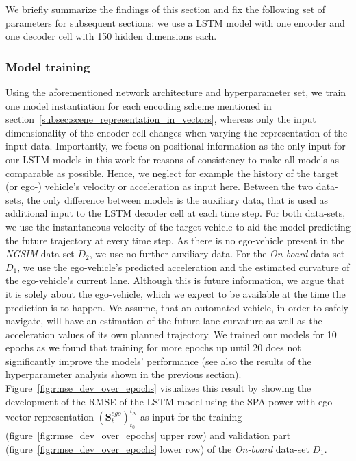 We briefly summarize the findings of this section and fix the following set of parameters for subsequent sections: we use a \ac{LSTM} model with one encoder and one decoder cell with \num{150} hidden dimensions each.

\subsubsection{Model training}%
\label{ssubsec:model_training_lstms}

Using the aforementioned network architecture and hyperparameter set, we train one model instantiation for each encoding scheme mentioned in section~\ref{subsec:scene_representation_in_vectors}, whereas only the input dimensionality of the encoder cell changes when varying the representation of the input data.
Importantly, we focus on positional information as the only input for our \ac{LSTM} models in this work for reasons of consistency to make all models as comparable as possible.
Hence, we neglect for example the history of the target (or ego-) vehicle's velocity or acceleration as input here.
Between the two data-sets, the only difference between models is the auxiliary data, that is used as additional input to the \ac{LSTM} decoder cell at each time step.
For both data-sets, we use the instantaneous velocity of the target vehicle to aid the model predicting the future trajectory at every time step.
As there is no ego-vehicle present in the \emph{\ac{NGSIM}} data-set $D_2$, we use no further auxiliary data.
For the \emph{On-board} data-set $D_1$, we use the ego-vehicle's predicted acceleration and the estimated curvature of the ego-vehicle's current lane.
Although this is future information, we argue that it is solely about the ego-vehicle, which we expect to be available at the time the prediction is to happen.
We assume, that an automated vehicle, in order to safely navigate, will have an estimation of the future lane curvature as well as the acceleration values of its own planned trajectory.
We trained our models for \num{10} epochs as we found that training for more epochs up until \num{20} does not significantly improve the models' performance (see also the results of the hyperparameter analysis shown in the previous section).
Figure~\ref{fig:rmse_dev_over_epochs} visualizes this result by showing the development of the \ac{RMSE} of the \ac{LSTM} model using the \ac{SPA}-power-with-ego vector representation $(\mathbf{S}_{t}^{ego})_{t_0}^{t_N}$ as input for the training (figure~\ref{fig:rmse_dev_over_epochs} upper row) and validation part (figure~\ref{fig:rmse_dev_over_epochs} lower row) of the \emph{On-board} data-set $D_1$.

